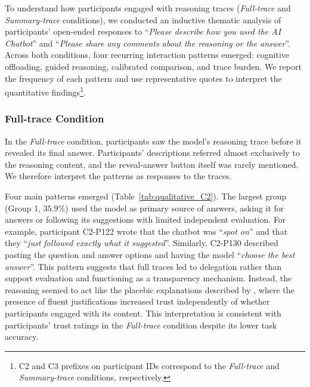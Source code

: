 \documentclass[manuscript,review,anonymous]{acmart}
\begin{document}
To understand how participants engaged with reasoning traces (\textit{Full-trace} and \textit{Summary-trace} conditions), we conducted an inductive thematic analysis \cite{clarke2017thematic} of participants' open-ended responses to ``\textit{Please describe how you used the AI Chatbot}'' and ``\textit{Please share any comments about the reasoning or the answer}''. Across both conditions, four recurring interaction patterns emerged: cognitive offloading, guided reasoning, calibrated comparison, and trace burden. We report the frequency of each pattern and use representative quotes to interpret the quantitative findings\footnote{ C2 and C3 prefixes on participant IDs correspond to the \textit{Full-trace} and \textit{Summary-trace} conditions, respectively.}.



\subsubsection{Full-trace Condition}

In the \textit{Full-trace} condition, participants saw the model's reasoning trace before it revealed its final answer. Participants' descriptions referred almost exclusively to the reasoning content, and the reveal-answer button itself was rarely mentioned. We therefore interpret the patterns as responses to the traces.


Four main patterns emerged (Table~\ref{tab:qualitative_C2}).
The largest group (Group 1, $35.9\%$) used the model as primary source of answers, asking it for answers or following its suggestions with limited independent evaluation. For example, participant C2-P122 wrote that the chatbot was ``\textit{spot on}'' and that they ``\textit{just followed exactly what it suggested}''. Similarly, C2-P130 described pasting the question and answer options and having the model ``\textit{choose the best answer}''. This pattern suggests that full traces led to delegation rather than support evaluation and functioning as a transparency mechanism. Instead, the reasoning seemed to act like the placebic explanations described by \citet{eiband2019impact}, where the presence of fluent justifications increased trust independently of whether participants engaged with its content. This interpretation is consistent with participants' trust ratings in the \textit{Full-trace} condition despite its lower task accuracy.
\end{document}
